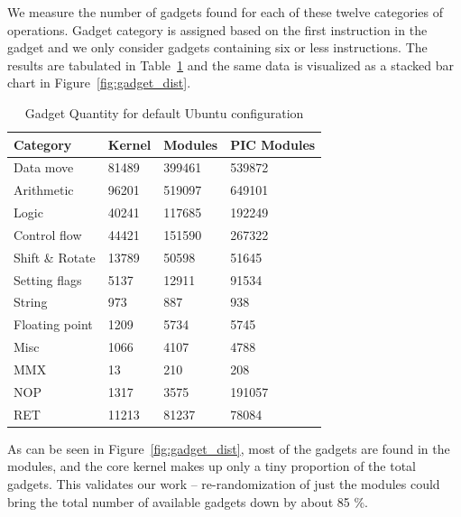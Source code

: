 We measure the number of gadgets found for each of these twelve categories of operations. Gadget category is assigned based on the first instruction in the gadget and we only consider gadgets containing six or less instructions. The results are tabulated in Table~\ref{tbl:gadget_quantity} and the same data is visualized as a stacked bar chart in Figure~\ref{fig:gadget_dist}.


\begin{table}
    \caption{Gadget Quantity for default Ubuntu configuration}
    \begin{center}
    \begin{tabular}{l|l|l|l}
    \toprule
    \textbf{Category} & Kernel & Modules & PIC Modules \\
    \toprule
    Data move & 81489 & 399461 & 539872  \\
    \hline
    Arithmetic & 96201 & 519097 & 649101 \\
    \hline
    Logic & 40241 & 117685 & 192249 \\
    \hline
    Control flow & 44421 & 151590 & 267322 \\
    \hline
    Shift \& Rotate & 13789 & 50598 & 51645  \\
    \hline
    Setting flags & 5137 & 12911 & 91534  \\
    \hline
    String & 973 & 887 & 938 \\
    \hline
    Floating point & 1209 & 5734 & 5745 \\
    \hline
    Misc & 1066 & 4107 & 4788 \\
    \hline
    MMX & 13 & 210 & 208 \\
    \hline
    NOP & 1317 & 3575 & 191057 \\
    \hline
    RET & 11213 & 81237 & 78084 \\
    \bottomrule
    \end{tabular}
    \end{center}
    \label{tbl:gadget_quantity}
\end{table}

As can be seen in Figure~\ref{fig:gadget_dist}, most of the gadgets are found in the modules, and the core kernel makes up only a tiny proportion of the total gadgets. This validates our work -- re-randomization of just the modules could bring the total number of available gadgets down by about 85 \%.

